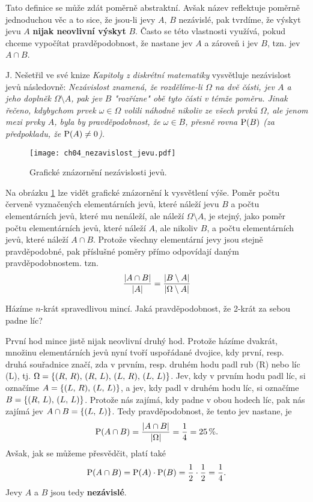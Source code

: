 Tato definice se může zdát poměrně abstraktní. Avšak název reflektuje poměrně jednoduchou věc a to sice, že jsou-li jevy $A,\,B$ nezávislé, pak tvrdíme, že výskyt jevu $A$ \textbf{nijak neovlivní výskyt} $B$. Často se této vlastnosti využívá, pokud chceme vypočítat pravděpodobnost, že nastane jev $A$ a zároveň i jev $B$, tzn. jev $A\cap B$.\par
J. Nešetřil ve své knize \emph{Kapitoly z diskrétní matematiky} vysvětluje nezávislost jevů následovně: \textit{Nezávislost znamená, že rozdělíme-li $\Omega$ na dvě části, jev $A$ a jeho doplněk $\Omega\setminus A$, pak jev $B$ "rozřízne" obě tyto části v témže poměru. Jinak řečeno, kdybychom prvek $\omega\in\Omega$ volili náhodně nikoliv ze všech prvků $\Omega$, ale jenom mezi prvky $A$, byla by pravděpodobnost, že $\omega\in B$, přesně rovna $\operatorname{\text{P}}(B)$ (za předpokladu, že $\operatorname{\text{P}}(A)\neq 0$).} \citep[str. 314]{MatousekNesetril2009}
\begin{figure}[H]
    \centering
    \texttt{[image: ch04\_nezavislost\_jevu.pdf]}
    \caption{Grafické znázornění nezávislosti jevů.}
    \label{fig:nezavislost_jevu}
\end{figure}
Na obrázku \ref{fig:nezavislost_jevu} lze vidět grafické znázornění k vysvětlení výše. Poměr počtu červeně vyznačených elementárních jevů, které náleží jevu $B$ a počtu elementárních jevů, které mu nenáleží, ale náleží $\Omega\setminus A$, je stejný, jako poměr počtu elementárních jevů, které náleží $A$, ale nikoliv $B$, a počtu elementárních jevů, které náleží $A\cap B$. Protože všechny elementární jevy jsou stejně pravděpodobné, pak příslušné poměry přímo odpovídají daným pravděpodobnostem. tzn.
\[\dfrac{\left| A\cap B \right|}{\left| A \right|}=\dfrac{\left| B\setminus A \right|}{\left| \Omega\setminus A \right|}\]
\begin{task}
    Házíme $n$-krát spravedlivou mincí. Jaká pravděpodobnost, že 2-krát za sebou padne líc?
\end{task}
\begin{solution}
    První hod mince jistě nijak neovlivní druhý hod. Protože házíme dvakrát, množinu elementárních jevů nyní tvoří uspořádané dvojice, kdy první, resp. druhá souřadnice značí, zda v prvním, resp. druhém hodu padl rub (R) nebo líc (L), tj. $\Omega=\left\{(R,\,R),\,(R,\,L),\,(L,\,R),\,(L,\,L)\right\}$. Jev, kdy v prvním hodu padl líc, si označíme $A=\left\{(L,\,R),\,(L,\,L)\right\}$, a jev, kdy padl v druhém hodu líc, si označíme $B=\left\{(R,\,L),\,(L,\,L)\right\}$. Protože nás zajímá, kdy padne v obou hodech líc, pak nás zajímá jev $A\cap B=\left\{(L,\,L)\right\}$. Tedy pravděpodobnost, že tento jev nastane, je
    \[\operatorname{\text{P}}(A\cap B)=\dfrac{\left| A\cap B \right|}{\left| \Omega \right|}=\dfrac{1}{4}=25\,\%.\]
    Avšak, jak se můžeme přesvědčit, platí také
    \[\operatorname{\text{P}}(A\cap B)=\operatorname{\text{P}}(A)\cdot\operatorname{\text{P}}(B)=\dfrac{1}{2}\cdot\dfrac{1}{2}=\dfrac{1}{4}.\]
    Jevy $A$ a $B$ jsou tedy \textbf{nezávislé}.
\end{solution}
